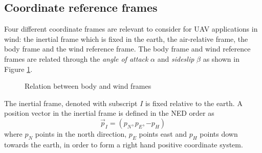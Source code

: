 \subsection{Coordinate reference frames}
Four different coordinate frames are relevant to consider for UAV applications in wind: the inertial frame which is 
fixed in the earth, the air-relative frame, the body frame and the wind reference frame. The body frame and wind reference frames are related through the \textit{angle of attack} $\alpha$ and \textit{sideslip} $\beta$
 as shown in Figure \ref{fig:body_wind_frame}.
\begin{figure}
    \begin{center}
    \end{center}
    \caption{Relation between body and wind frames}
    \label{fig:body_wind_frame}
\end{figure}

\begin{definition}
    The inertial frame, denoted with subscript $I$ is fixed relative to the earth.
    A position vector in the inertial frame is defined in the NED order as
    \begin{equation}
        \vec{p}_I = (p_N, p_E, -p_H)
    \end{equation}
    where $p_N$ points in the north direction, $p_E$ points east and $p_H$ points down towards the earth,
    in order to form a right hand positive coordinate system.
\end{definition}

